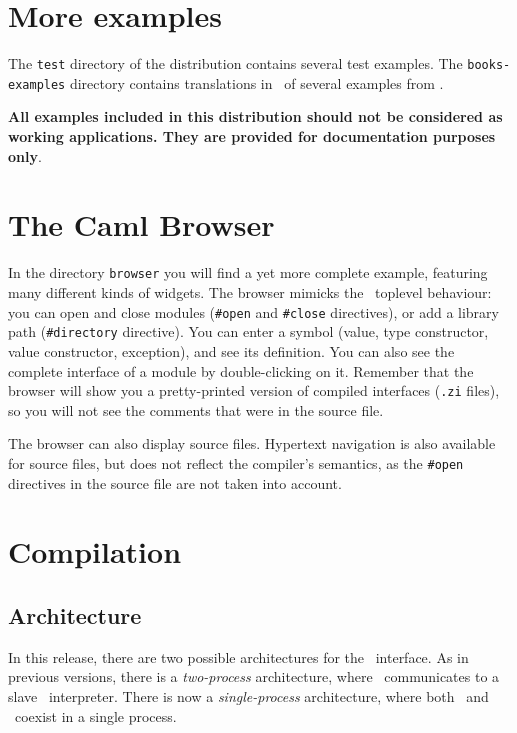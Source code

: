 \section{More examples}
The \verb|test| directory of the distribution contains several test
examples. 
The \verb|books-examples| directory contains translations in \camltk\ of
several examples from \cite{ouster94}.


{\bf All examples included in this distribution  should not be considered as
working applications. They are provided for documentation purposes only}.

\section{The Caml Browser}
In the directory {\tt browser} you will find a yet more complete example,
featuring many different kinds of widgets. The browser mimicks the 
\caml\ toplevel behaviour: you can open and close modules ({\tt \#open} and
{\tt \#close} directives), or add a library path ({\tt \#directory} directive).
You can enter a symbol (value, type constructor, value constructor,
exception), and see its definition. You can also see the complete interface
of a module by double-clicking on it. 
Remember that the browser will show you a pretty-printed version
of compiled interfaces ({\tt .zi} files), so you will not see the comments
that were in the source file.

The browser can also display source files. Hypertext navigation is also
available for source files, but does not reflect the compiler's semantics,
as the \verb|#open| directives in the source file are not taken into
account.


\section{Compilation}
\label{sec:compiling}
\subsection{Architecture}
In this release, there are two possible architectures for the \camltk\
interface. As in previous versions, there is a {\em two-process}
architecture, where \caml\ communicates to a slave \wish\ interpreter.
There is now a {\em single-process} architecture, where both \caml\ and \tk\
coexist in a single process.

